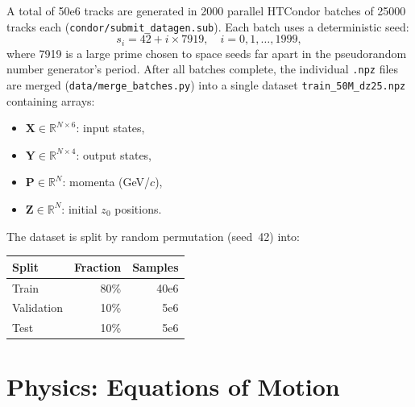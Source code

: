\documentclass[a4paper,11pt]{article}
\newcommand{\num}[1]{#1}
\begin{document}
A total of \num{50e6} tracks are generated in 2000 parallel HTCondor
batches of \num{25000} tracks each
(\texttt{condor/submit\_datagen.sub}).  Each batch uses a
deterministic seed:
\begin{equation}
  s_i = 42 + i \times 7919, \quad i = 0, 1, \ldots, 1999,
  \label{eq:seed}
\end{equation}
where 7919 is a large prime chosen to space seeds far apart in the
pseudorandom number generator's period.  After all batches complete, the
individual \texttt{.npz} files are merged
(\texttt{data/merge\_batches.py}) into a single dataset
\texttt{train\_50M\_dz25.npz} containing arrays:
\begin{itemize}
  \item $\mathbf{X} \in \mathbb{R}^{N \times 6}$: input states,
  \item $\mathbf{Y} \in \mathbb{R}^{N \times 4}$: output states,
  \item $\mathbf{P} \in \mathbb{R}^{N}$: momenta (GeV/$c$),
  \item $\mathbf{Z} \in \mathbb{R}^{N}$: initial $z_0$ positions.
\end{itemize}
The dataset is split by random permutation (seed~42) into:
\begin{center}
\begin{tabular}{lrr}
\toprule
Split & Fraction & Samples \\
\midrule
Train      & 80\% & \num{40e6} \\
Validation & 10\% & \num{5e6}  \\
Test       & 10\% & \num{5e6}  \\
\bottomrule
\end{tabular}
\end{center}

\section{Physics: Equations of Motion}
\label{sec:physics}
\end{document}
